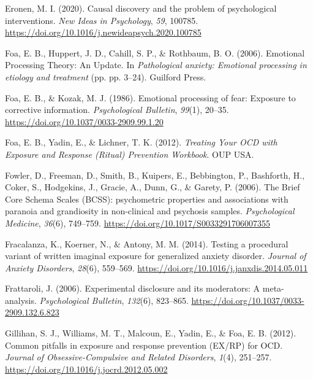 \documentclass[
  man,floatsintext]{apa7}
\newlength{\cslhangindent}
\newlength{\cslentryspacingunit} %
\newenvironment{CSLReferences}[2] %
 {%
  \setlength{\parindent}{0pt}
  \ifodd #1
  \let\oldpar\par
  \def\par{\hangindent=\cslhangindent\oldpar}
  \fi
  \setlength{\parskip}{#2\cslentryspacingunit}
 }%
 {}
\begin{document}
\begin{CSLReferences}{1}{0}
\leavevmode{}%
Eronen, M. I. (2020). Causal discovery and the problem of psychological interventions. \emph{New Ideas in Psychology}, \emph{59}, 100785. \url{https://doi.org/10.1016/j.newideapsych.2020.100785}

\leavevmode{}%
Foa, E. B., Huppert, J. D., Cahill, S. P., \& Rothbaum, B. O. (2006). Emotional Processing Theory: An Update. In \emph{Pathological anxiety: Emotional processing in etiology and treatment} (pp. pp. 3--24). Guilford Press.

\leavevmode{}%
Foa, E. B., \& Kozak, M. J. (1986). Emotional processing of fear: Exposure to corrective information. \emph{Psychological Bulletin}, \emph{99}(1), 20--35. \url{https://doi.org/10.1037/0033-2909.99.1.20}

\leavevmode{}%
Foa, E. B., Yadin, E., \& Lichner, T. K. (2012). \emph{Treating Your OCD with Exposure and Response (Ritual) Prevention Workbook}. OUP USA.

\leavevmode{}%
Fowler, D., Freeman, D., Smith, B., Kuipers, E., Bebbington, P., Bashforth, H., Coker, S., Hodgekins, J., Gracie, A., Dunn, G., \& Garety, P. (2006). The Brief Core Schema Scales (BCSS): psychometric properties and associations with paranoia and grandiosity in non-clinical and psychosis samples. \emph{Psychological Medicine}, \emph{36}(6), 749--759. \url{https://doi.org/10.1017/S0033291706007355}

\leavevmode{}%
Fracalanza, K., Koerner, N., \& Antony, M. M. (2014). Testing a procedural variant of written imaginal exposure for generalized anxiety disorder. \emph{Journal of Anxiety Disorders}, \emph{28}(6), 559--569. \url{https://doi.org/10.1016/j.janxdis.2014.05.011}

\leavevmode{}%
Frattaroli, J. (2006). Experimental disclosure and its moderators: A meta-analysis. \emph{Psychological Bulletin}, \emph{132}(6), 823--865. \url{https://doi.org/10.1037/0033-2909.132.6.823}

\leavevmode{}%
Gillihan, S. J., Williams, M. T., Malcoun, E., Yadin, E., \& Foa, E. B. (2012). Common pitfalls in exposure and response prevention (EX/RP) for OCD. \emph{Journal of Obsessive-Compulsive and Related Disorders}, \emph{1}(4), 251--257. \url{https://doi.org/10.1016/j.jocrd.2012.05.002}


\end{CSLReferences}
\end{document}
